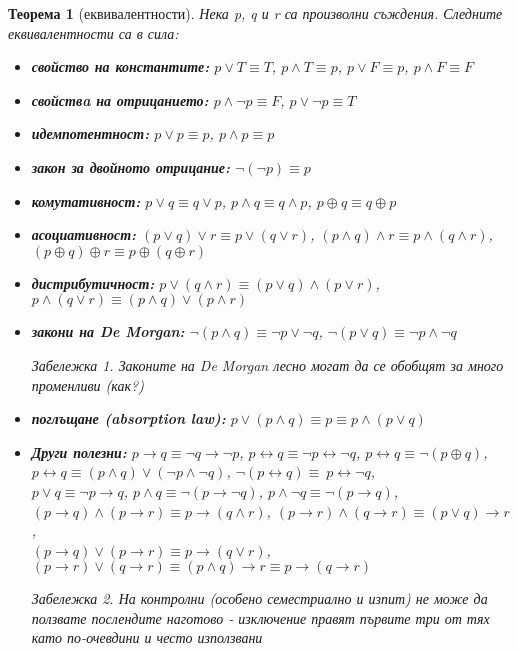 \documentclass[10pt, a4paper]{article}
\newtheorem{theorem}{Теорема}[section]
\theoremstyle{definition}
\theoremstyle{remark}
\newtheorem*{remark}{Забележка}
\begin{document}
\begin{theorem}[еквивалентности]
Нека p, q и r са произволни съждения. Следните еквивалентности са в сила:
    \begin{itemize}
        \item \textbf{свойство на константите:} \(p \vee T \equiv T\), \(p \wedge T \equiv p\), \(p \vee F \equiv p\), \(p \wedge F \equiv F\)
        \item \textbf{свойствa на отрицанието:} \(p\wedge \neg p \equiv F\), \(p\vee \neg p \equiv T\)
        \item \textbf{идемпотентност:} \(p\vee p \equiv p\), \(p\wedge p \equiv p\)
        \item \textbf{закон за двойното отрицание:} \(\neg (\neg p)\equiv p\)
        \item \textbf{комутативност:} \(p\vee q\equiv q\vee p\), \(p\wedge q\equiv q\wedge p\), \(p\oplus q\equiv q\oplus p\)
        \item \textbf{асоциативност:} \((p\vee q)\vee r\equiv p\vee (q\vee r)\), \((p\wedge q)\wedge r\equiv p\wedge (q\wedge r)\), \((p\oplus q)\oplus r\equiv p\oplus (q\oplus r)\)
        \item \textbf{дистрибутичност:} \(p\vee (q\wedge r) \equiv (p\vee q) \wedge (p\vee r)\), \(p\wedge (q\vee r) \equiv (p\wedge q) \vee (p\wedge r)\) 
        \item \textbf{закони на De Morgan:} \(\neg(p\wedge q)\equiv \neg p \vee \neg q\), \(\neg(p\vee q)\equiv \neg p \wedge \neg q\)
        \begin{remark}
            Законите на De Morgan лесно могат да се обобщят за много променливи (как?)
        \end{remark}
        \item \textbf{поглъщане (absorption law):} \(p\vee(p\wedge q)\equiv p\equiv p\wedge(p\vee q)\)
        \item \textbf{Други полезни:}
        \(p \rightarrow q \equiv \neg q \rightarrow \neg p\), \(p \leftrightarrow q \equiv \neg p \leftrightarrow \neg q\), \(p \leftrightarrow q \equiv \neg(p\oplus q)\),\\
        \(p \leftrightarrow q \equiv (p \wedge q) \vee (\neg p \wedge \neg q)\), \(\neg(p\leftrightarrow q)\equiv\ p\leftrightarrow \neg q\),\\
        \(p\vee q \equiv \neg p \rightarrow q\), \(p\wedge q \equiv \neg (p \rightarrow \neg q)\), \(p\wedge \neg q \equiv \neg (p \rightarrow q)\),\\
        \((p \rightarrow q) \wedge (p \rightarrow r) \equiv p \rightarrow (q \wedge r)\), \((p \rightarrow r) \wedge (q \rightarrow r) \equiv (p \vee q) \rightarrow r\),\\ \((p \rightarrow q) \vee (p \rightarrow r) \equiv p \rightarrow (q \vee r)\), \((p \rightarrow r) \vee (q \rightarrow r) \equiv (p \wedge q) \rightarrow r \equiv p \rightarrow (q \rightarrow r)\)
        \begin{remark} На контролни (особено семестриално и изпит) не може да ползвате послендите наготово - изключение правят първите три от тях като по-очевдини и често използвани\end{remark}
    \end{itemize}
\end{theorem}
\hfill
\end{document}
